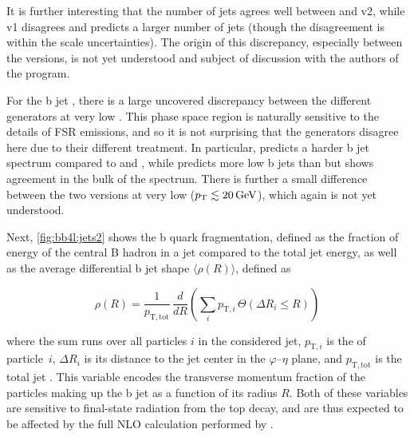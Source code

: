 It is further interesting that the number of jets agrees well between \tttWsum and \bbfourl v2, while \bbfourl v1 disagrees and predicts a larger number of jets (though the disagreement is within the scale uncertainties). The origin of this discrepancy, especially between the \bbfourl versions, is not yet understood and subject of discussion with the authors of the program.

For the b jet \pt, there is a large uncovered discrepancy between the different generators at very low \pt. This phase space region is naturally sensitive to the details of FSR emissions, and so it is not surprising that the generators disagree here due to their different treatment. In particular, \ttb predicts a harder b jet \pt spectrum compared to \bbfourl and \tttW, while \tttW predicts more low \pt b jets than \bbfourl but shows agreement in the bulk of the \pt spectrum. There is further a small difference between the two \bbfourl versions at very low \pt ($\pt \lesssim \SI{20}{\GeV}$), which again is not yet understood.


Next, \cref{fig:bb4l:jets2} shows the b quark fragmentation, defined as the fraction of energy of the central B hadron in a jet compared to the total jet energy, as well as the average differential b jet shape $\langle \rho (R) \rangle$, defined as

\begin{equation}
  \rho(R) = \frac{1}{p_{\mathrm{T},\mathrm{tot}}} \, \frac{d}{dR} \left( \sum_i p_{\mathrm{T},i} \, \Theta(\Delta R_i \leq R)  \right)
\end{equation}

\noindent where the sum runs over all particles $i$ in the considered jet, $p_{\mathrm{T},i}$ is the \pt of particle~$i$, $\Delta R_i$ is its distance to the jet center in the $\varphi$--$\eta$ plane, and $p_{\mathrm{T},\mathrm{tot}}$ is the total jet \pt.
This variable encodes the transverse momentum fraction of the particles making up the b jet as a function of its radius $R$.
Both of these variables are sensitive to final-state radiation from the top decay, and are thus expected to be affected by the full NLO calculation performed by \bbfourl. 

